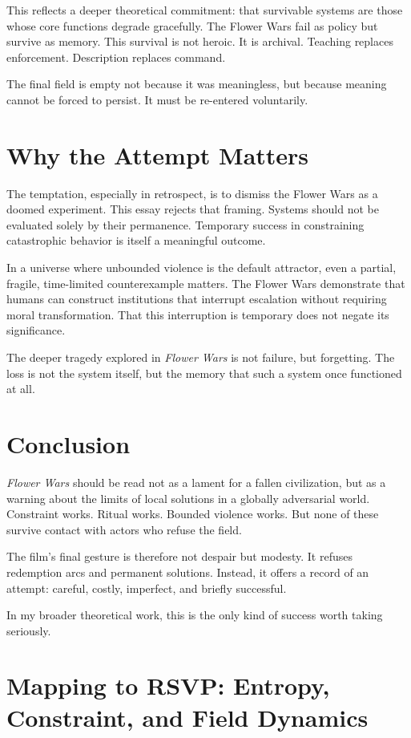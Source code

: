 \documentclass[12pt]{article}
\begin{document}
This reflects a deeper theoretical commitment: that survivable systems are those whose core functions degrade gracefully. The Flower Wars fail as policy but survive as memory. This survival is not heroic. It is archival. Teaching replaces enforcement. Description replaces command.

The final field is empty not because it was meaningless, but because meaning cannot be forced to persist. It must be re-entered voluntarily.

\section*{Why the Attempt Matters}

The temptation, especially in retrospect, is to dismiss the Flower Wars as a doomed experiment. This essay rejects that framing. Systems should not be evaluated solely by their permanence. Temporary success in constraining catastrophic behavior is itself a meaningful outcome.

In a universe where unbounded violence is the default attractor, even a partial, fragile, time-limited counterexample matters. The Flower Wars demonstrate that humans can construct institutions that interrupt escalation without requiring moral transformation. That this interruption is temporary does not negate its significance.

The deeper tragedy explored in \textit{Flower Wars} is not failure, but forgetting. The loss is not the system itself, but the memory that such a system once functioned at all.

\section*{Conclusion}

\textit{Flower Wars} should be read not as a lament for a fallen civilization, but as a warning about the limits of local solutions in a globally adversarial world. Constraint works. Ritual works. Bounded violence works. But none of these survive contact with actors who refuse the field.

The film's final gesture is therefore not despair but modesty. It refuses redemption arcs and permanent solutions. Instead, it offers a record of an attempt: careful, costly, imperfect, and briefly successful.

In my broader theoretical work, this is the only kind of success worth taking seriously.

\section*{Mapping to RSVP: Entropy, Constraint, and Field Dynamics}
\end{document}
